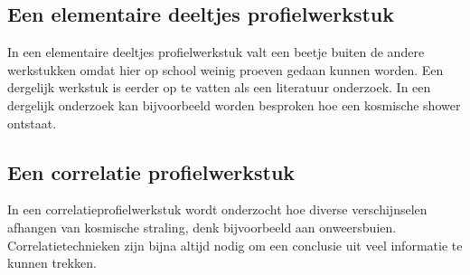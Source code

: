 \subsection{Een elementaire deeltjes profielwerkstuk}

In een elementaire deeltjes profielwerkstuk valt een beetje buiten
de andere werkstukken omdat hier op school weinig proeven gedaan kunnen
worden. Een dergelijk werkstuk is eerder op te vatten als een literatuur
onderzoek. In een dergelijk onderzoek kan bijvoorbeeld worden besproken
hoe een kosmische shower ontstaat.


\subsection{Een correlatie profielwerkstuk}

In een correlatieprofielwerkstuk wordt onderzocht hoe diverse verschijnselen
afhangen van kosmische straling, denk bijvoorbeeld aan onweersbuien.
Correlatietechnieken zijn bijna altijd nodig om een conclusie uit
veel informatie te kunnen trekken.


